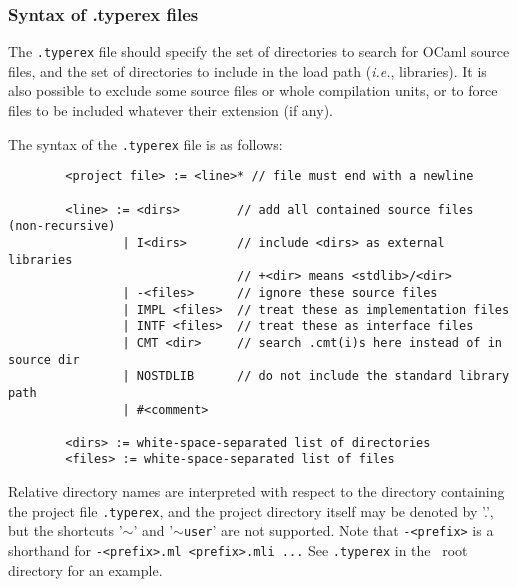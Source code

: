 \subsubsection*{Syntax of .typerex files}
The \verb!.typerex! file should specify the set of directories to
search for OCaml source files, and the set of directories to include
in the load path (\emph{i.e.}, libraries). It is also possible to
exclude some source files or whole compilation units, or to force
files to be included whatever their extension (if any).

The syntax of the \verb!.typerex! file is as follows:

{\verbsize\begin{verbatim}
        <project file> := <line>* // file must end with a newline

        <line> := <dirs>        // add all contained source files (non-recursive)
                | I<dirs>       // include <dirs> as external libraries
                                // +<dir> means <stdlib>/<dir>
                | -<files>      // ignore these source files
                | IMPL <files>  // treat these as implementation files
                | INTF <files>  // treat these as interface files
                | CMT <dir>     // search .cmt(i)s here instead of in source dir
                | NOSTDLIB      // do not include the standard library path
                | #<comment>

        <dirs> := white-space-separated list of directories
        <files> := white-space-separated list of files
\end{verbatim}}
\noindent Relative directory names are interpreted with respect to the
directory containing the project file \verb!.typerex!, and the project
directory itself may be denoted by '.', but the shortcuts '$\sim$' and
'$\sim$\verb!user!' are not supported. Note that \verb!-<prefix>! is a
shorthand for \verb!-<prefix>.ml <prefix>.mli ...! See \verb!.typerex! in
the \typerex\ root directory for an example.

